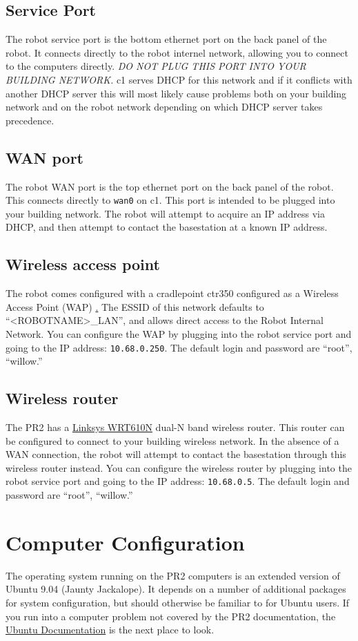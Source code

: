 \subsection{Service Port} The robot service port is the bottom
ethernet port on the back panel of the robot.  It connects directly to
the robot internel network, allowing you to connect to the computers
directly.  \textit{DO NOT PLUG THIS PORT INTO YOUR BUILDING NETWORK.}
c1 serves DHCP for this network and if it conflicts with another DHCP
server this will most likely cause problems both on your building
network and on the robot network depending on which DHCP server takes
precedence.
\subsection{WAN port} The robot WAN port is the top ethernet port on
the back panel of the robot.  This connects directly to \texttt{wan0}
on c1.  This port is intended to be plugged into your building
network.  The robot will attempt to acquire an IP address via DHCP,
and then attempt to contact the basestation at a known IP address.
\subsection{Wireless access point} The robot comes configured with a
cradlepoint ctr350 configured as a Wireless Access Point (WAP)
\href{http://www.cradlepoint.com/products/ctr350-mobile-broadband-router}.
The ESSID of this network defaults to ``<ROBOTNAME>\_LAN'', and allows
direct access to the Robot Internal Network.  You can configure the
WAP by plugging into the robot service port and going to the IP
address: \texttt{10.68.0.250}.  The default login and password are
``root'', ``willow.''

\subsection{Wireless router}
The PR2 has a
\href{http://www.linksysbycisco.com/US/en/products/WRT610N}{Linksys
  WRT610N} dual-N band wireless router.  This router can be configured
to connect to your building wireless network.  In the absence of a WAN
connection, the robot will attempt to contact the basestation through
this wireless router instead. You can configure the wireless router by
plugging into the robot service port and going to the IP address:
\texttt{10.68.0.5}.  The default login and password are ``root'',
``willow.''

\section{Computer Configuration}
The operating system running on the PR2 computers is an extended
version of Ubuntu 9.04 (Jaunty Jackalope). It depends on a number of
additional packages for system configuration, but should otherwise be
familiar to for Ubuntu users. If you run into a computer problem not
covered by the PR2 documentation, the
\href{https://help.ubuntu.com/9.04/index.html}{Ubuntu Documentation}
is the next place to look.

